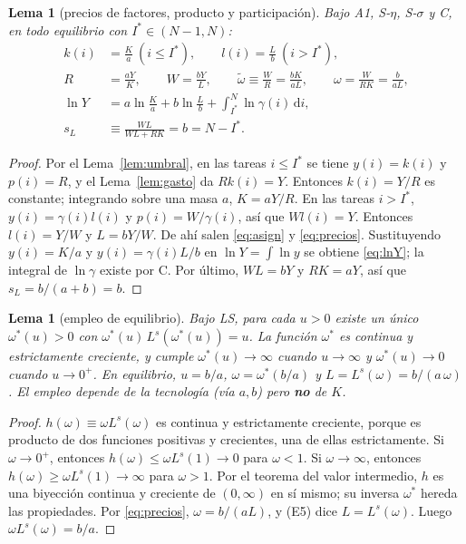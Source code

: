 \documentclass[11pt,a4paper]{article}
\numberwithin{equation}{section}
\theoremstyle{definition}
\theoremstyle{plain}
\newtheorem{lema}[definicion]{Lema}
\theoremstyle{remark}
\newcommand{\Is}{I^{*}}
\newcommand{\dd}{\,\mathrm{d}}
\newcommand{\wt}{\tilde\omega}
\begin{document}
\begin{lema}[precios de factores, producto y participación]\label{lem:precios}
Bajo \textsf{A1}, \textsf{S-$\eta$}, \textsf{S-$\sigma$} y \textsf{C}, en todo equilibrio con $\Is\in(N-1,N)$:
\begin{align}
  k(i)&=\frac{K}{a}\ (i\le\Is),\qquad l(i)=\frac{L}{b}\ (i>\Is), \label{eq:asign}\\
  R&=\frac{aY}{K},\qquad W=\frac{bY}{L},\qquad \wt\equiv\frac WR=\frac{bK}{aL},\qquad \omega=\frac{W}{RK}=\frac{b}{aL}, \label{eq:precios}\\
  \ln Y&=a\ln\frac{K}{a}+b\ln\frac{L}{b}+\int_{\Is}^{N}\ln\gamma(i)\dd i, \label{eq:lnY}\\
  s_L&\equiv\frac{WL}{WL+RK}=b=N-\Is. \label{eq:sL}
\end{align}
\end{lema}
\begin{proof}
Por el Lema~\ref{lem:umbral}, en las tareas $i\le\Is$ se tiene $y(i)=k(i)$ y $p(i)=R$, y el Lema~\ref{lem:gasto} da
$Rk(i)=Y$. Entonces $k(i)=Y/R$ es constante; integrando sobre una masa $a$, $K=aY/R$. En las tareas $i>\Is$,
$y(i)=\gamma(i)l(i)$ y $p(i)=W/\gamma(i)$, así que $Wl(i)=Y$. Entonces $l(i)=Y/W$ y $L=bY/W$. De ahí salen
\eqref{eq:asign} y \eqref{eq:precios}. Sustituyendo $y(i)=K/a$ y $y(i)=\gamma(i)L/b$ en $\ln Y=\int\ln y$ se
obtiene \eqref{eq:lnY}; la integral de $\ln\gamma$ existe por \textsf{C}. Por último,
$WL=bY$ y $RK=aY$, así que $s_L=b/(a+b)=b$.
\end{proof}

\begin{lema}[empleo de equilibrio]\label{lem:empleo}
Bajo \textsf{LS}, para cada $u>0$ existe un único $\omega^*(u)>0$ con $\omega^*(u)\,L^s(\omega^*(u))=u$. La función
$\omega^*$ es continua y estrictamente creciente, y cumple $\omega^*(u)\to\infty$ cuando $u\to\infty$ y
$\omega^*(u)\to0$ cuando $u\to0^+$. En equilibrio, $u=b/a$, $\omega=\omega^*(b/a)$ y $L=L^s(\omega)=b/(a\,\omega)$.
El empleo depende de la tecnología (vía $a,b$) pero \textbf{no} de $K$.
\end{lema}
\begin{proof}
$h(\omega)\equiv\omega L^s(\omega)$ es continua y estrictamente creciente, porque es producto de dos funciones
positivas y crecientes, una de ellas estrictamente. Si $\omega\to0^+$, entonces
$h(\omega)\le\omega L^s(1)\to0$ para $\omega<1$. Si $\omega\to\infty$, entonces
$h(\omega)\ge\omega L^s(1)\to\infty$ para $\omega>1$. Por el teorema del valor intermedio, $h$ es una biyección
continua y creciente de $(0,\infty)$ en sí mismo; su inversa $\omega^*$ hereda las propiedades. Por
\eqref{eq:precios}, $\omega=b/(aL)$, y (E5) dice $L=L^s(\omega)$. Luego $\omega L^s(\omega)=b/a$.
\end{proof}
\end{document}
